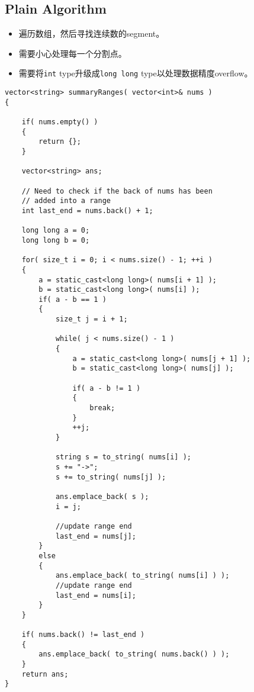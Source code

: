 \subsection{Plain Algorithm}
\begin{CJK*}{UTF8}{gbsn}
\begin{itemize}
\item 遍历数组，然后寻找连续数的segment。
\item 需要小心处理每一个分割点。
\item 需要将\texttt{int} type升级成\texttt{long long} type以处理数据精度overflow。
\end{itemize}
\end{CJK*}
\setcounter{lstlisting}{0}
\begin{lstlisting}[style=customc, caption={Plain Algorithm}]
vector<string> summaryRanges( vector<int>& nums )
{

    if( nums.empty() )
    {
        return {};
    }

    vector<string> ans;

    // Need to check if the back of nums has been
    // added into a range
    int last_end = nums.back() + 1;

    long long a = 0;
    long long b = 0;

    for( size_t i = 0; i < nums.size() - 1; ++i )
    {
        a = static_cast<long long>( nums[i + 1] );
        b = static_cast<long long>( nums[i] );
        if( a - b == 1 )
        {
            size_t j = i + 1;

            while( j < nums.size() - 1 )
            {
                a = static_cast<long long>( nums[j + 1] );
                b = static_cast<long long>( nums[j] );

                if( a - b != 1 )
                {
                    break;
                }
                ++j;
            }

            string s = to_string( nums[i] );
            s += "->";
            s += to_string( nums[j] );

            ans.emplace_back( s );
            i = j;

            //update range end
            last_end = nums[j];
        }
        else
        {
            ans.emplace_back( to_string( nums[i] ) );
            //update range end
            last_end = nums[i];
        }
    }

    if( nums.back() != last_end )
    {
        ans.emplace_back( to_string( nums.back() ) );
    }
    return ans;
}
\end{lstlisting}
